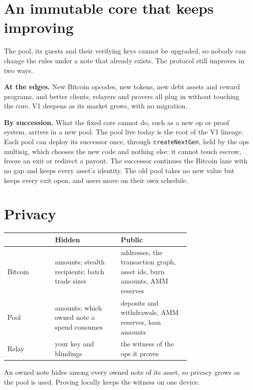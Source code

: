 \documentclass[11pt,letterpaper]{article}
\newcommand{\op}[1]{\texttt{#1}}
\begin{document}
\section{An immutable core that keeps improving}

The pool, its guests and their verifying keys cannot be upgraded, so nobody can change the rules under a
note that already exists. The protocol still improves in two ways.

\textbf{At the edges.} New Bitcoin opcodes, new tokens, new debt assets and reward programs, and better
clients, relayers and provers all plug in without touching the core. V1 deepens as its market grows,
with no migration.

\textbf{By succession.} What the fixed core cannot do, such as a new op or proof system, arrives in a new
pool. The pool live today is the root of the V1 lineage. Each pool can deploy its successor once, through
\op{createNextGen}, held by the ops multisig, which chooses the new code and nothing else: it cannot touch
escrow, freeze an exit or redirect a payout. The successor continues the Bitcoin lane with no gap and
keeps every asset's identity. The old pool takes no new value but keeps every exit open, and users move
on their own schedule.

\section{Privacy}

\begin{center}\small
\begin{tabular}{@{}l>{\raggedright}p{0.36\linewidth}>{\raggedright\arraybackslash}p{0.38\linewidth}@{}}
\toprule
 & \textbf{Hidden} & \textbf{Public} \\
\midrule
Bitcoin & amounts; stealth recipients; batch trade sizes & addresses, the transaction graph, asset ids, burn amounts, AMM reserves \\
Pool & amounts; which owned note a spend consumes & deposits and withdrawals, AMM reserves, loan amounts \\
Relay & your key and blindings & the witness of the ops it proves \\
\bottomrule
\end{tabular}
\end{center}

An owned note hides among every owned note of its asset, so privacy grows as the pool is used. Proving
locally keeps the witness on one device.
\end{document}
